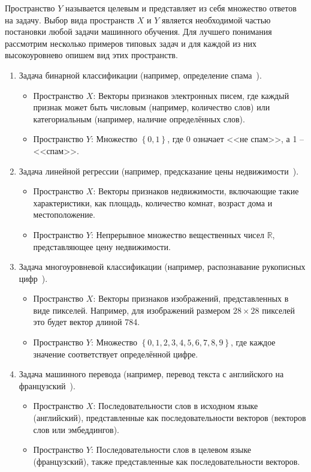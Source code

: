 Пространство $Y$ называется целевым и представляет из себя множество ответов на задачу. Выбор вида пространств $X$ и $Y$ является необходимой частью постановки любой задачи машинного обучения. Для лучшего понимания рассмотрим несколько примеров типовых задач и для каждой из них высокоуровнево опишем вид этих пространств.
\begin{enumerate}
    \item Задача бинарной классификации (например, определение спама~\cite{hadi, adnan}).
    \begin{itemize}[label=\textbullet]
        \item Пространство $X$: Векторы признаков электронных писем, где каждый признак может быть числовым (например, количество слов) или категориальным (например, наличие определённых слов).
        \item Пространство $Y$: Множество $\left\{0, 1\right\}$, где 0 означает <<не спам>>, а 1 – <<спам>>.
    \end{itemize}
    
    \item Задача линейной регрессии (например, предсказание цены недвижимости~\cite{yazdani, sharmah, yadav}).
    \begin{itemize}[label=\textbullet]
        \item Пространство $X$: Векторы признаков недвижимости, включающие такие характеристики, как площадь, количество комнат, возраст дома и местоположение.
        \item Пространство $Y$: Непрерывное множество вещественных чисел $\mathbb{R}$, представляющее цену недвижимости.
    \end{itemize}
    
    \item Задача многоуровневой классификации (например, распознавание рукописных цифр~\cite{sultana, siddique, pashine}).
    \begin{itemize}[label=\textbullet]
        \item Пространство $X$: Векторы признаков изображений, представленных в виде пикселей. Например, для изображений размером $28 \times 28$ пикселей это будет вектор длиной 784.
        \item Пространство $Y$: Множество $\left\{0, 1, 2, 3, 4, 5, 6, 7, 8, 9\right\}$, где каждое значение соответствует определённой цифре.
    \end{itemize}
    
    \item Задача машинного перевода (например, перевод текста с английского на французский~\cite{zhangj, lyu}).
    \begin{itemize}[label=\textbullet]
        \item Пространство $X$: Последовательности слов в исходном языке (английский), представленные как последовательности векторов (векторов слов или эмбеддингов).
        \item Пространство $Y$: Последовательности слов в целевом языке (французский), также представленные как последовательности векторов.
    \end{itemize}
    

\end{enumerate}
